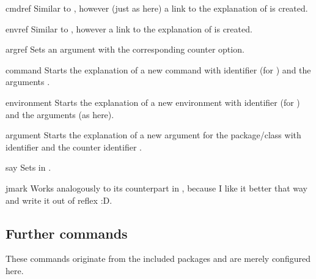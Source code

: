 \documentclass{sopra-base}
\begin{document}
\begin{command}{cmdref}{}
    Similar to , however (just as here) a link to the explanation of  is created.
\end{command}

\begin{command}{envref}{}
    Similar to , however a link to the explanation of  is created.
\end{command}

\begin{command}{argref}{}
    Sets an argument with the corresponding counter option.
\end{command}


\begin{environment}{command}{}
    Starts the explanation of a new command with identifier  (for ) and the arguments .
\end{environment}

\begin{environment}{environment}{}
    Starts the explanation of a new environment with identifier  (for ) and the arguments  (as here).
\end{environment}

\begin{environment}{argument}{}
    Starts the explanation of a new argument for the package/class with identifier  and the counter identifier .
\end{environment}

\begin{command}{say}{}
    Sets  in .
\end{command}

\begin{command}{jmark}{}
    Works analogously to its counterpart in , because I like it better that way and write it out of reflex :D.
\end{command}

\subsection{Further commands}

These commands originate from the included packages and are merely configured here.
\end{document}
